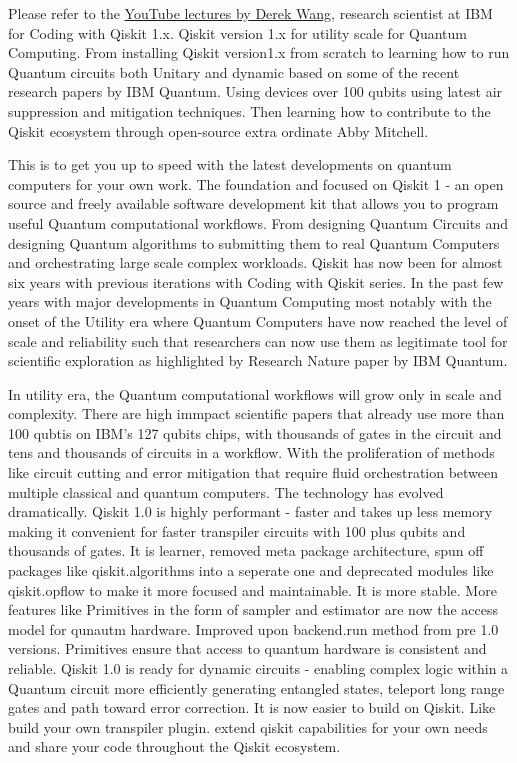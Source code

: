 \documentclass[12pt, oneside]{book}
\theoremstyle{definition}
\theoremstyle{definition}
\theoremstyle{remark}
\begin{document}
Please refer to the \href{https://www.youtube.com/watch?v=oaAjxcIFLtM}{YouTube lectures by Derek Wang}, research scientist at IBM for 
Coding with Qiskit 1.x. Qiskit version 1.x for utility scale for Quantum Computing. From installing Qiskit version1.x from scratch 
to learning how to run Quantum circuits both Unitary and dynamic based on some of the recent research papers by IBM Quantum. Using devices over 100 qubits using 
latest air suppression and mitigation techniques. Then learning how to contribute to the Qiskit ecosystem through open-source extra ordinate Abby Mitchell.

This is to get you up to speed with the latest developments on quantum computers for your own work. The foundation and focused on Qiskit 1 - an open source and freely available software development kit that allows you to program useful Quantum computational workflows. From designing Quantum Circuits and designing Quantum algorithms to submitting them to real Quantum Computers and orchestrating large scale complex workloads. Qiskit has now been for almost six years with previous iterations with Coding with Qiskit series. In the past few years with major developments in Quantum Computing most notably with the onset of the Utility era where Quantum Computers have now reached the level of scale and reliability such that researchers can now use them as legitimate tool for scientific exploration as highlighted by Research Nature paper by IBM Quantum. 

In utility era, the Quantum computational workflows will grow only in scale and complexity. There are high immpact scientific papers that already use more than 100 qubtis on IBM's 127 qubits chips, with thousands of gates in the circuit and tens and thousands of circuits in a workflow. With the proliferation of methods like circuit cutting and error mitigation that require fluid orchestration between multiple classical and quantum computers. The technology has evolved dramatically. Qiskit 1.0 is highly performant - faster and takes up less memory making it convenient for faster transpiler circuits with 100 plus qubits and thousands of gates. It is learner, removed meta package architecture, spun off packages like qiskit.algorithms into a seperate one and deprecated modules like qiskit.opflow to make it more focused and maintainable. It is more stable. More features like Primitives in the form of sampler and estimator are now the access model for qunautm hardware. Improved upon backend.run method from pre 1.0 versions. Primitives ensure that access to quantum hardware is consistent and reliable. Qiskit 1.0 is ready for dynamic circuits - enabling complex logic within a Quantum circuit more efficiently generating entangled states, teleport long range gates and path toward error correction. It is now easier to build on Qiskit. Like build your own transpiler plugin. extend qiskit capabilities for your own needs and share your code throughout the Qiskit ecosystem. 
\end{document}
